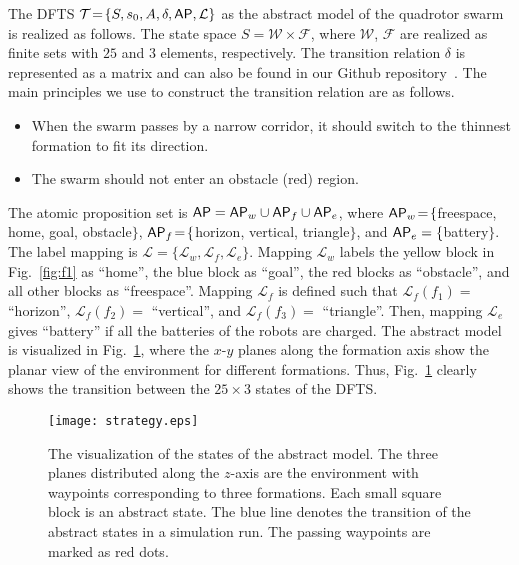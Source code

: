 \documentclass[letterpaper, 10 pt, conference]{ieeeconf}
\begin{document}
The DFTS $\mathcal{T}\!=\!\{S, s_0, A, \delta, \mathsf{AP}, \mathcal{L}\}$ as the abstract model of the quadrotor swarm is realized as follows. The state space $S \!=\! \mathcal{W} \!\times\! \mathcal{F}$, where $\mathcal{W}$, $\mathcal{F}$ are realized as finite sets with $25$ and $3$ elements, respectively. The transition relation $\delta$ is represented as a matrix and can also be found in our Github repository~\cite{ourCode}. The main principles we use to construct the transition relation are as follows.
\begin{itemize}
\item When the swarm passes by a narrow corridor, it should switch to the thinnest formation to fit its direction.
\item The swarm should not enter an obstacle (red) region.
\end{itemize}
The atomic proposition set is $\mathsf{AP} = \mathsf{AP}_w \cup \mathsf{AP}_f \cup \mathsf{AP}_e$, where $\mathsf{AP}_w \!=\! \{$freespace, home, goal, obstacle$\}$, $\mathsf{AP}_f\!=\!\{$horizon, vertical, triangle$\}$, and $\mathsf{AP}_e=\{$battery$\}$. The label mapping is $\mathcal{L} \!=\! \{\mathcal{L}_w, \mathcal{L}_f,\mathcal{L}_e\}$. Mapping $\mathcal{L}_w$ labels the yellow block in Fig.~\ref{fig:f1} as ``home'', the blue block as ``goal'', the red blocks as ``obstacle'', and all other blocks as ``freespace''. Mapping $\mathcal{L}_f$ is defined such that $\mathcal{L}_f(f_1) =$ ``horizon'', $\mathcal{L}_f(f_2)=$ ``vertical'', and $\mathcal{L}_f(f_3) =$ ``triangle''. Then, mapping $\mathcal{L}_e$ gives ``battery'' if all the batteries of the robots are charged. The abstract model is visualized in Fig.~\ref{fig:strategy}, where the $x$-$y$ planes along the formation axis show the planar view of the environment for different formations. Thus, Fig.~\ref{fig:strategy} clearly shows the transition between the $25 \times 3$ states of the DFTS.


\begin{figure}[htpb]
    \centering
    \texttt{[image: strategy.eps]}
    \caption{The visualization of the states of the abstract model. The three planes distributed along the $z$-axis are the environment with waypoints corresponding to three formations. Each small square block is an abstract state. The blue line denotes the transition of the abstract states in a simulation run. The passing waypoints are marked as red dots.}
    \label{fig:strategy}
    \vspace{-0.1cm}
\end{figure}
\end{document}
